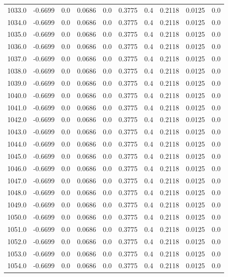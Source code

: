 \begin{longtable}{lrrrrrrrrr}
1033.0 & -0.6699 & 0.0 & 0.0686 & 0.0 & 0.3775 & 0.4 & 0.2118 & 0.0125 & 0.0 \\
1034.0 & -0.6699 & 0.0 & 0.0686 & 0.0 & 0.3775 & 0.4 & 0.2118 & 0.0125 & 0.0 \\
1035.0 & -0.6699 & 0.0 & 0.0686 & 0.0 & 0.3775 & 0.4 & 0.2118 & 0.0125 & 0.0 \\
1036.0 & -0.6699 & 0.0 & 0.0686 & 0.0 & 0.3775 & 0.4 & 0.2118 & 0.0125 & 0.0 \\
1037.0 & -0.6699 & 0.0 & 0.0686 & 0.0 & 0.3775 & 0.4 & 0.2118 & 0.0125 & 0.0 \\
1038.0 & -0.6699 & 0.0 & 0.0686 & 0.0 & 0.3775 & 0.4 & 0.2118 & 0.0125 & 0.0 \\
1039.0 & -0.6699 & 0.0 & 0.0686 & 0.0 & 0.3775 & 0.4 & 0.2118 & 0.0125 & 0.0 \\
1040.0 & -0.6699 & 0.0 & 0.0686 & 0.0 & 0.3775 & 0.4 & 0.2118 & 0.0125 & 0.0 \\
1041.0 & -0.6699 & 0.0 & 0.0686 & 0.0 & 0.3775 & 0.4 & 0.2118 & 0.0125 & 0.0 \\
1042.0 & -0.6699 & 0.0 & 0.0686 & 0.0 & 0.3775 & 0.4 & 0.2118 & 0.0125 & 0.0 \\
1043.0 & -0.6699 & 0.0 & 0.0686 & 0.0 & 0.3775 & 0.4 & 0.2118 & 0.0125 & 0.0 \\
1044.0 & -0.6699 & 0.0 & 0.0686 & 0.0 & 0.3775 & 0.4 & 0.2118 & 0.0125 & 0.0 \\
1045.0 & -0.6699 & 0.0 & 0.0686 & 0.0 & 0.3775 & 0.4 & 0.2118 & 0.0125 & 0.0 \\
1046.0 & -0.6699 & 0.0 & 0.0686 & 0.0 & 0.3775 & 0.4 & 0.2118 & 0.0125 & 0.0 \\
1047.0 & -0.6699 & 0.0 & 0.0686 & 0.0 & 0.3775 & 0.4 & 0.2118 & 0.0125 & 0.0 \\
1048.0 & -0.6699 & 0.0 & 0.0686 & 0.0 & 0.3775 & 0.4 & 0.2118 & 0.0125 & 0.0 \\
1049.0 & -0.6699 & 0.0 & 0.0686 & 0.0 & 0.3775 & 0.4 & 0.2118 & 0.0125 & 0.0 \\
1050.0 & -0.6699 & 0.0 & 0.0686 & 0.0 & 0.3775 & 0.4 & 0.2118 & 0.0125 & 0.0 \\
1051.0 & -0.6699 & 0.0 & 0.0686 & 0.0 & 0.3775 & 0.4 & 0.2118 & 0.0125 & 0.0 \\
1052.0 & -0.6699 & 0.0 & 0.0686 & 0.0 & 0.3775 & 0.4 & 0.2118 & 0.0125 & 0.0 \\
1053.0 & -0.6699 & 0.0 & 0.0686 & 0.0 & 0.3775 & 0.4 & 0.2118 & 0.0125 & 0.0 \\
1054.0 & -0.6699 & 0.0 & 0.0686 & 0.0 & 0.3775 & 0.4 & 0.2118 & 0.0125 & 0.0 \\

\end{longtable}
